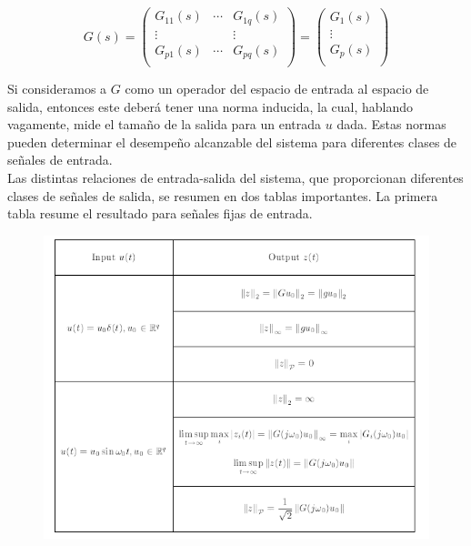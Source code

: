 \begin{equation*}
  G(s) = \left(
\begin{array}{ccc}
 G_{11}(s) & \cdots & G_{1q}(s) \\
 \vdots &  & \vdots \\
 G_{p1}(s) & \cdots & G_{pq}(s) \\
\end{array}
\right) = \left(
\begin{array}{c}
 G_1(s) \\
 \vdots \\
 G_p(s) \\
\end{array}
\right)
\end{equation*}

Si consideramos a $G$ como un operador del espacio de entrada al espacio de salida, entonces este deberá tener una norma inducida, la cual, hablando vagamente, mide el tamaño de la salida para un entrada $u$ dada. Estas normas pueden determinar el desempeño alcanzable del sistema para diferentes clases de señales de entrada. \\

Las distintas relaciones de entrada-salida del sistema, que proporcionan diferentes clases de señales de salida, se resumen en dos tablas importantes. La primera tabla resume el resultado para señales fijas de entrada.

\begin{figure}[H]
    \centering
    \includegraphics[scale = 0.9]{Control/Controlf1.png}
\end{figure}

